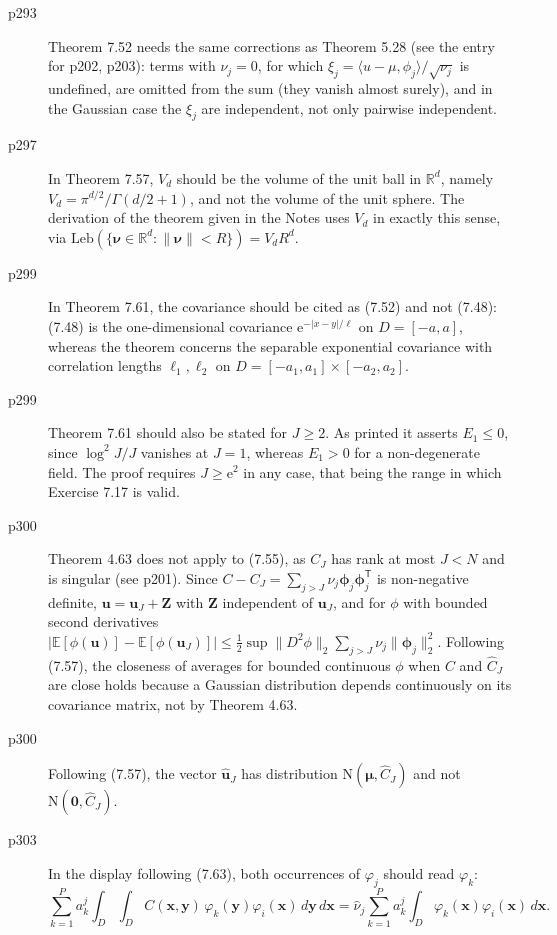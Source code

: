 \documentclass[final]{article}
\theoremstyle{definition}
\newcommand{\vecbs}[1]{\boldsymbol{#1}}
\renewcommand{\vec}[1]{{\vecbs{#1}}}
\begin{document}
\begin{enumerate}
\begin{description}
   \item[p293] Theorem 7.52 needs the same corrections as Theorem 5.28 (see
the entry for p202, p203): terms with $\nu_j=0$, for which
$\xi_j=\langle u-\mu,\phi_j\rangle/\sqrt{\nu_j}$ is undefined, are omitted
from the sum (they vanish almost surely), and in the Gaussian case the $\xi_j$
are independent, not only pairwise independent.
   \item[p297] In Theorem 7.57, $V_d$ should be the volume of the unit ball in
$\mathbb{R}^d$, namely $V_d=\pi^{d/2}/\Gamma(d/2+1)$, and not the volume of the
unit sphere. The derivation of the theorem given in the Notes uses $V_d$ in
exactly this sense, via
$\mathrm{Leb}(\{\vec\nu\in\mathbb{R}^d:\|\vec\nu\|<R\})=V_dR^d$.
   \item[p299] In Theorem 7.61, the covariance should be cited as (7.52) and not
(7.48): (7.48) is the one-dimensional covariance $\mathrm{e}^{-|x-y|/\ell}$ on
$D=[-a,a]$, whereas the theorem concerns the separable exponential covariance
with correlation lengths $\ell_1,\ell_2$ on $D=[-a_1,a_1]\times[-a_2,a_2]$.
   \item[p299] Theorem 7.61 should also be stated for $J\ge2$. As printed it
asserts $E_1\le0$, since $\log^2 J/J$ vanishes at $J=1$, whereas $E_1>0$ for a
non-degenerate field. The proof requires $J\ge\mathrm{e}^{2}$ in any case, that
being the range in which Exercise 7.17 is valid.
   \item[p300] Theorem 4.63 does not apply to (7.55), as $C_J$ has rank at most
$J<N$ and is singular (see p201). Since $C-C_J=\sum_{j>J}\nu_j\vec\phi_j\vec\phi_j^{\mathsf T}$
is non-negative definite, $\vec u=\vec u_J+\vec Z$ with $\vec Z$ independent of
$\vec u_J$, and for $\phi$ with bounded second derivatives
$|\mathbb{E}[\phi(\vec u)]-\mathbb{E}[\phi(\vec u_J)]|
\le\tfrac12\sup\|D^2\phi\|_2\sum_{j>J}\nu_j\|\vec\phi_j\|_2^2$. Following (7.57),
the closeness of averages for bounded continuous $\phi$ when $C$ and $\widehat
C_J$ are close holds because a Gaussian distribution depends continuously on its
covariance matrix, not by Theorem 4.63.
   \item[p300] Following (7.57), the vector $\widehat{\vec u}_J$ has distribution
$\mathrm{N}(\vec\mu,\widehat C_J)$ and not $\mathrm{N}(\vec 0,\widehat C_J)$.
   \item[p303] In the display following (7.63), both occurrences of $\varphi_j$
should read $\varphi_k$:
\[
\sum_{k=1}^{P}a_k^{j}\int_D\!\int_D C(\vec x,\vec y)\,\varphi_k(\vec y)\varphi_i(\vec x)\,d\vec y\,d\vec x
=\hat\nu_j\sum_{k=1}^{P}a_k^{j}\int_D \varphi_k(\vec x)\varphi_i(\vec x)\,d\vec x.
\]
\end{description}
\end{enumerate}
\end{document}

